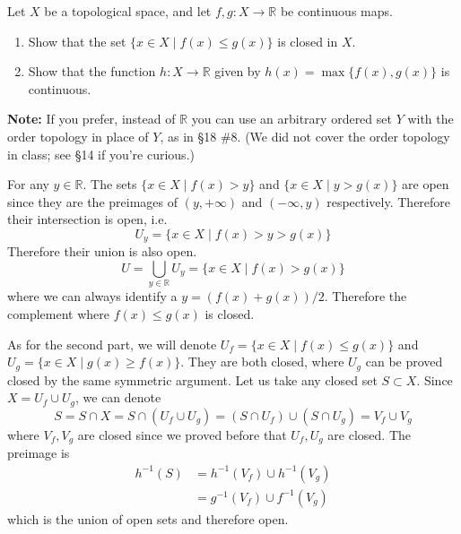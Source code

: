   \begin{exercise}
    Let $X$ be a topological space, and let $f,g: X \to \mathbb{R}$ be continuous maps.
    \begin{enumerate}
      \item Show that the set $\{x \in X \mid f(x) \leq g(x)\}$ is closed in $X$.
      
      \item Show that the function $h: X \to \mathbb{R}$ given by $h(x) = \max\{f(x),g(x)\}$ is continuous.
    \end{enumerate}
    
    \noindent\textbf{Note:} If you prefer, instead of $\mathbb{R}$ you can use an arbitrary ordered set $Y$ with the order topology in place of $Y$, as in \S18 \#8. (We did not cover the order topology in class; see \S14 if you're curious.)
  \end{exercise}
  \begin{solution}
    For any $y \in \mathbb{R}$. The sets $\{x \in X \mid f(x) > y\}$ and $\{x \in X \mid y > g(x)\}$ are open since they are the preimages of $(y, +\infty)$ and $(-\infty, y)$ respectively. Therefore their intersection is open, i.e. 
    \begin{equation}
      U_y = \{x \in X \mid f(x) > y > g(x)\}
    \end{equation} 
    Therefore their union is also open. 
    \begin{equation}
      U = \bigcup_{y \in \mathbb{R}} U_y = \{x \in X \mid f(x) > g(x)\}
    \end{equation}
    where we can always identify a $y = (f(x) + g(x))/2$. Therefore the complement where $f(x) \leq g(x)$ is closed. 
    
    As for the second part, we will denote $U_f = \{x \in X \mid f(x) \leq g(x)\}$ and $U_g = \{x \in X \mid g(x) \geq f(x) \}$. They are both closed, where $U_g$ can be proved closed by the same symmetric argument. Let us take any closed set $S \subset X$. Since $X = U_f \cup U_g$, we can denote 
    \begin{equation}
      S = S \cap X = S \cap (U_f \cup U_g) = (S \cap U_f) \cup (S \cap U_g) = V_f \cup V_g
    \end{equation}
    where $V_f, V_g$ are closed since we proved before that $U_f, U_g$ are closed. The preimage is 
    \begin{align}
      h^{-1} (S) & = h^{-1} (V_f) \cup h^{-1} (V_g) \\
                 & = g^{-1} (V_f) \cup f^{-1} (V_g)
    \end{align}
    which is the union of open sets and therefore open. 
  \end{solution}

